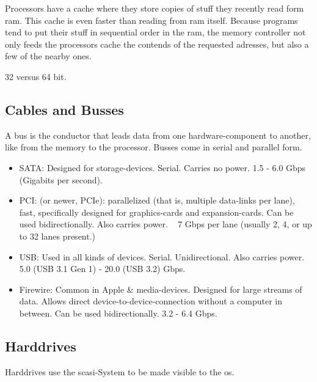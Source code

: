 Processors have a cache where they store copies of stuff they recently read form ram. This cache is even faster than reading from ram itself. Because programs tend to put their stuff in sequential order in the ram, the memory controller not only feeds the processors cache the contends of the requested adresses, but also a few of the nearby ones. 

32 versus 64 bit.


\subsection{Cables and Busses}

A bus is the conductor that leads data from one hardware-component to another, like from the memory to the processor. Busses come in serial and parallel form. 

\begin{itemize}
    \item SATA: Designed for storage-devices. Serial. Carries no power. 1.5 - 6.0 Gbps (Gigabits per second).
    \item PCI: (or newer, PCIe): parallelized (that is, multiple data-links per lane), fast, specifically designed for graphics-cards and expansion-cards. Can be used bidirectionally. Also carries power. ~ 7 Gbps per lane (usually 2, 4, or up to 32 lanes present.)
    \item USB: Used in all kinds of devices. Serial. Unidirectional. Also carries power. 5.0 (USB 3.1 Gen 1) - 20.0 (USB 3.2) Gbps.
    \item Firewire: Common in Apple & media-devices. Designed for large streams of data. Allows direct device-to-device-connection without a computer in between. Can be used bidirectionally. 3.2 - 6.4 Gbps.
\end{itemize}



\subsection{Harddrives}
Harddrives use the scasi-System to be made visible to the os. 

